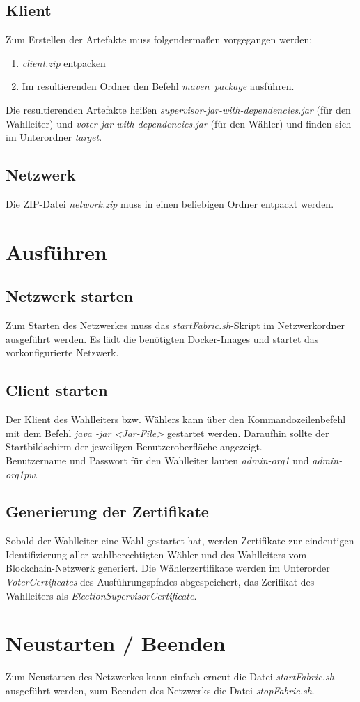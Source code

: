 \documentclass[parskip=full]{scrartcl}
\newcommand{\textitx}[1]{\mbox{\textit{#1}}}
\begin{document}
	\subsection{Klient}
	Zum Erstellen der Artefakte muss folgendermaßen vorgegangen werden:
	\begin{enumerate}
		\item \textit{client.zip} entpacken
		\item Im resultierenden Ordner den Befehl \textitx{maven package} ausführen.
	\end{enumerate}
	Die resultierenden Artefakte heißen \textit{supervisor-jar-with-dependencies.jar} (für den Wahlleiter) und \textit{voter-jar-with-dependencies.jar} (für den Wähler) und finden sich im Unterordner \textit{target}.
	\subsection{Netzwerk}
	Die ZIP-Datei \textit{network.zip} muss in einen beliebigen Ordner entpackt werden. 

	\section{Ausführen}
	\subsection{Netzwerk starten}
	Zum Starten des Netzwerkes muss das \textit{startFabric.sh}-Skript im Netzwerkordner ausgeführt werden. Es lädt die benötigten Docker-Images und startet das vorkonfigurierte Netzwerk.
	\subsection{Client starten}
	Der Klient des Wahlleiters bzw. Wählers kann über den Kommandozeilenbefehl mit dem Befehl \textit{java -jar <Jar-File>} gestartet werden. Daraufhin sollte der Startbildschirm der jeweiligen Benutzeroberfläche angezeigt. \\
	Benutzername und Passwort für den Wahlleiter lauten \textit{admin-org1} und \textit{admin-org1pw}.

    \subsection{Generierung der Zertifikate}
    Sobald der Wahlleiter eine Wahl gestartet hat, werden Zertifikate zur eindeutigen Identifizierung aller wahlberechtigten Wähler und des Wahlleiters vom Blockchain-Netzwerk generiert. Die Wählerzertifikate werden im Unterorder \textit{VoterCertificates} des Ausführungspfades abgespeichert, das Zerifikat des Wahlleiters als \textit{ElectionSupervisorCertificate}.
    
    \section{Neustarten / Beenden}
    Zum Neustarten des Netzwerkes kann einfach erneut die Datei \textit{startFabric.sh} ausgeführt werden,
    zum Beenden des Netzwerks die Datei \textit{stopFabric.sh}.
		
\end{document}
